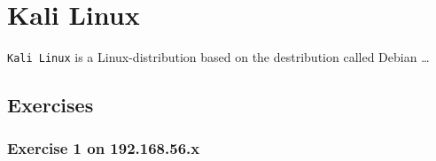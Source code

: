 \section{Kali Linux}
\texttt{Kali Linux} is a Linux-distribution based on the destribution
called Debian\cite{KALIDEBIAN} \dots

\subsection{Exercises}
\subsubsection{Exercise 1 on 192.168.56.x}
\begin{verbatim}

\end{verbatim}

